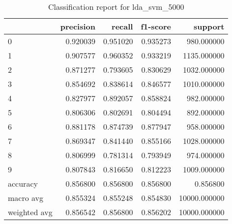 \begin{table}[htb!]
\centering
\caption{Classification report for lda_svm_5000}
\label{tab:classification-report-lda_svm_5000}
\begin{tabular}{lrrrr}
\toprule
 & precision & recall & f1-score & support \\
\midrule
0 & 0.920039 & 0.951020 & 0.935273 & 980.000000 \\
1 & 0.907577 & 0.960352 & 0.933219 & 1135.000000 \\
2 & 0.871277 & 0.793605 & 0.830629 & 1032.000000 \\
3 & 0.854692 & 0.838614 & 0.846577 & 1010.000000 \\
4 & 0.827977 & 0.892057 & 0.858824 & 982.000000 \\
5 & 0.806306 & 0.802691 & 0.804494 & 892.000000 \\
6 & 0.881178 & 0.874739 & 0.877947 & 958.000000 \\
7 & 0.869347 & 0.841440 & 0.855166 & 1028.000000 \\
8 & 0.806999 & 0.781314 & 0.793949 & 974.000000 \\
9 & 0.807843 & 0.816650 & 0.812223 & 1009.000000 \\
accuracy & 0.856800 & 0.856800 & 0.856800 & 0.856800 \\
macro avg & 0.855324 & 0.855248 & 0.854830 & 10000.000000 \\
weighted avg & 0.856542 & 0.856800 & 0.856202 & 10000.000000 \\
\bottomrule
\end{tabular}
\end{table}
